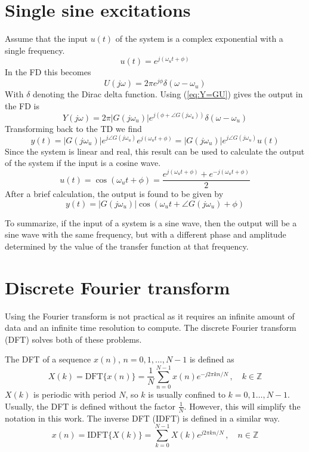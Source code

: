 \newpage
\section{Single sine excitations}
Assume that the input $u(t)$ of the system is a complex exponential with a single frequency.
\begin{equation*}
    u(t) = e^{j (\omega_u t + \phi)}
\end{equation*}
In the FD this becomes
\begin{equation*}
    U(j\omega) = 2\pi e^{j\phi} \delta(\omega-\omega_u)
\end{equation*}
With $\delta$ denoting the Dirac delta function. Using (\ref{eq:Y=GU}) gives the output in the FD is
\begin{equation*}
    Y(j\omega) = 2\pi |G(j\omega_u)| e^{j(\phi+\angle{G(j\omega_u)})} \delta(\omega-\omega_u)
\end{equation*}
Transforming back to the TD we find
\begin{equation*}
    y(t) = |G(j\omega_u)| e^{j \angle{G(j\omega_u)}} e^{j (\omega_u t + \phi)} = |G(j\omega_u)| e^{j \angle{G(j\omega_u)}} u(t)
\end{equation*}
Since the system is linear and real, this result can be used to calculate the output of the system if the input is a cosine wave.
\begin{equation*}
    u(t) = \cos{(\omega_u t + \phi)} = \frac{e^{j(\omega_u t + \phi)}+e^{-j(\omega_u t + \phi)}}{2}
\end{equation*}
After a brief calculation, the output is found to be given by
\begin{equation*}
\boxed{
    y(t) = |G(j\omega_u)| \cos{(\omega_u t + \angle{G(j\omega_u)} + \phi)}
    }
\end{equation*}

To summarize, if the input of a system is a sine wave, then the output will be a sine wave with the same frequency, but with a different phase and amplitude determined by the value of the transfer function at that frequency.

\section{Discrete Fourier transform}
Using the Fourier transform is not practical as it requires an infinite amount of data and an infinite time resolution to compute. The discrete Fourier transform (DFT) solves both of these problems.

The DFT of a sequence $x(n)$, $n = 0,1,\ldots,N-1$ is defined as
\begin{equation*}
    X(k) = \text{DFT}\{x(n)\} = \frac{1}{N}\sum_{n=0}^{N-1} x(n) e^{-j 2\pi k n/N} \,,\quad k \in \mathds{Z}
\end{equation*}
$X(k)$ is periodic with period $N$, so $k$ is usually confined to $k = 0,1 \ldots, N-1$. Usually, the DFT is defined without the factor $\frac{1}{N}$. However, this will simplify the notation in this work. The inverse DFT (IDFT) is defined in a similar way.
\begin{equation*}
    x(n) = \text{IDFT}\{X(k)\} = \sum_{k=0}^{N-1} X(k) e^{j 2\pi k n/N} \,,\quad n \in \mathds{Z}
\end{equation*}

